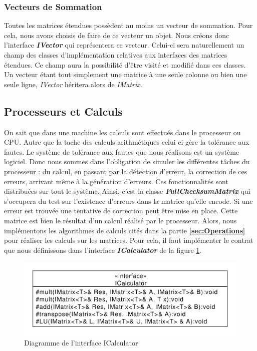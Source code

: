 \documentclass[a4paper, 10pt]{report}
\begin{document}
\subsubsection{Vecteurs de Sommation}
Toutes les matrices étendues possèdent au moins un vecteur de sommation. Pour cela, nous avons choisis de faire de 
ce vecteur un objet. Nous créons donc l’interface \textbf{\textit {IVector}} qui représentera ce vecteur. Celui-ci sera 
naturellement un champ des classes d’implémentation relatives aux interfaces des matrices étendues. Ce champ aura la 
possibilité d’être visité et modifié dans ces classes. Un vecteur étant tout simplement une matrice à une seule colonne 
ou bien une seule ligne, \textit{IVector} héritera alors de \textit{IMatrix}.

\subsection{Processeurs et Calculs}
On sait que dans une machine les calculs sont effectués dans le processeur ou CPU. Autre que la tache des calculs 
arithmétiques celui ci gère la tolérance aux fautes. Le système de tolérance aux fautes que nous réalisons est un 
système logiciel. Donc nous sommes dans l’obligation de simuler les différentes tâches du processeur : du calcul, 
en passant par la détection d’erreur, la correction de ces erreurs, arrivant même à la génération d’erreurs. Ces 
fonctionnalités sont distribuées sur tout le système. Ainsi, c’est la classe \textbf{\textit{FullChecksumMatrix}} qui 
s’occupera du test sur l’existence d’erreurs dans la matrice qu’elle encode. Si une erreur est trouvée une tentative 
de correction peut être mise en place. Cette matrice est bien le résultat d’un calcul réalisé par le processeur. 
Alors, nous implémentons les algorithmes de calculs cités dans la partie \textbf{\ref{sec:Operations}} pour réaliser les calculs sur 
les matrices. Pour cela, il faut implémenter le contrat que nous définissons dans l’interface \textbf{\textit{ICalculator}} 
de la figure \ref{fig:Diag3}.\newline
\begin{figure}
 \center
 \includegraphics[scale=0.35]{ICalculator.pdf}
 \caption{Diagramme de l'interface ICalculator}
  \label{fig:Diag3}
\end{figure}
\end{document}
